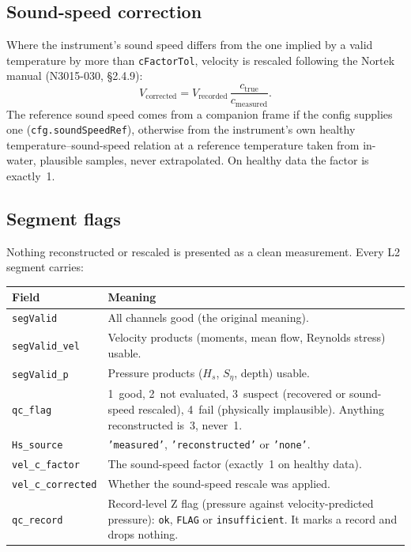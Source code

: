 \documentclass[11pt]{article}
\newcommand{\code}[1]{\texttt{#1}}
\begin{document}
\subsection{Sound-speed correction}

Where the instrument's sound speed differs from the one implied by a valid temperature by more
than \code{cFactorTol}, velocity is rescaled following the Nortek manual (N3015-030,
\S2.4.9):
\[
  V_\text{corrected} = V_\text{recorded}\,\frac{c_\text{true}}{c_\text{measured}} .
\]
The reference sound speed comes from a companion frame if the config supplies one
(\code{cfg.soundSpeedRef}), otherwise from the instrument's own healthy temperature--sound-speed
relation at a reference temperature taken from in-water, plausible samples, never extrapolated.
On healthy data the factor is exactly~1.

\subsection{Segment flags}

Nothing reconstructed or rescaled is presented as a clean measurement. Every L2 segment carries:

\begin{center}
\begin{tabular}{@{}l p{10.5cm}@{}}
\toprule
Field & Meaning \\
\midrule
\code{segValid}      & All channels good (the original meaning). \\
\code{segValid\_vel} & Velocity products (moments, mean flow, Reynolds stress) usable. \\
\code{segValid\_p}   & Pressure products ($H_s$, $S_\eta$, depth) usable. \\
\code{qc\_flag}      & 1~good, 2~not evaluated, 3~suspect (recovered or sound-speed rescaled),
  4~fail (physically implausible). Anything reconstructed is~3, never~1. \\
\code{Hs\_source}    & \code{'measured'}, \code{'reconstructed'} or \code{'none'}. \\
\code{vel\_c\_factor} & The sound-speed factor (exactly~1 on healthy data). \\
\code{vel\_c\_corrected} & Whether the sound-speed rescale was applied. \\
\code{qc\_record}    & Record-level Z flag (pressure against velocity-predicted pressure):
  \code{ok}, \code{FLAG} or \code{insufficient}. It marks a record and drops nothing. \\
\bottomrule
\end{tabular}
\end{center}
\end{document}
